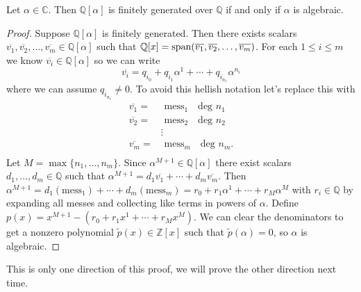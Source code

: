 \begin{lemma}
     Let \(\alpha \in \mathbb{C} \). Then \(\mathbb{Q} [\alpha ]\) is finitely generated over \(\mathbb{Q} \) if and only if \(\alpha \) is algebraic.    
\end{lemma}
\begin{proof}
    Suppose \(\mathbb{Q} [\alpha ]\) is finitely generated. Then there exists scalars \\ \(\overline{v_1} , \overline{v_2} ,\dots ,\overline{v_m} \in \mathbb{Q} [\alpha ] \) such that \(\mathbb{Q} [x] = \operatorname{span}(\overline{v_1} , \overline{v_2} ,\dots ,\overline{v_m})\). For each \(1 \leq i \leq m\) we know \(\overline{v_i} \in \mathbb{Q} [\alpha ] \) so we can write
    \[
        \overline{v_i} = q_{i_{0}} + q_{i_{1}} \alpha ^{1} + \cdots + q_{i_{n_{1}}} \alpha ^{n_{i}}
    \]
    where we can assume \(q_{i_{n_{i}}} \neq 0\). To avoid this hellish notation let's replace this with 
    \begin{align*}
        \overline{v_1} =& \text{ mess}_1 \quad \text{deg } n_1  \\
        \overline{v_2} =& \text{ mess}_2 \quad \text{deg } n_2  \\
        &\vdots \\
        \overline{v_m} =& \text{ mess}_m \quad \text{deg } n_m . \\
    \end{align*}
    Let \(M = \max\{ n_1,\dots ,n_m \} \). Since \(\alpha ^{M+1} \in \mathbb{Q} [\alpha ]\) there exist scalars \\ \(d_1, \dots ,d_m \in \mathbb{Q} \) such that \(\alpha ^{M+1} = d_1 \overline{v_1} + \cdots + d_m \overline{v_m}  \). Then \(\alpha ^{M+1} = d_1 (\text{mess}_1 ) + \cdots + d_m (\text{mess}_m ) = r_0 + r_1 \alpha ^1 + \cdots + r_M \alpha ^M  \) with \(r_i \in \mathbb{Q} \) by expanding all messes and collecting like terms in powers of \(\alpha \). Define \(p(x) = x^{M+1} - (r_0 + r_1 x ^1 + \cdots + r_M x ^M ) \). We can clear the denominators to get a nonzero polynomial \(\widetilde{p}(x) \in \mathbb{Z} [x]\) such that \(\widetilde{p}(\alpha ) = 0\), so \(\alpha \) is algebraic. 
\end{proof}
\begin{note}
    This is only one direction of this proof, we will prove the other direction next time.
\end{note}

